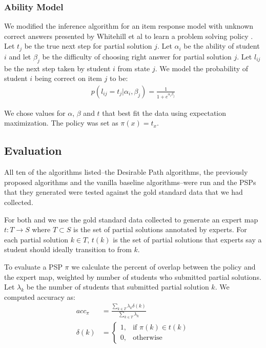 \subsubsection{Ability Model}

We modified the inference algorithm for an item response model with unknown correct answers presented by Whitehill et al to learn a problem solving policy \cite{whitehill2009whose}. Let $t_j$ be the true next step for partial solution $j$. Let $\alpha_i$ be the ability of student $i$ and let $\beta_j$ be the difficulty of choosing right answer for partial solution $j$. Let $l_{ij}$ be the next step taken by student $i$ from state $j$. We model the probability of student $i$ being correct on item $j$ to be:
\begin{align*}
p(l_{ij} = t_j | \alpha_i, \beta_j) = \frac{1}{1 + e^{\alpha_i \beta_j}}
\end{align*}

We chose values for $\alpha$, $\beta$ and $t$ that best fit the data using expectation maximization. The policy was set as $\pi(x) = t_x$.





\subsection{Evaluation}
All ten of the algorithms listed--the Desirable Path algorithms, the previously proposed algorithms and the vanilla baseline algorithms--were run and the PSPs that they generated were tested against the gold standard data that we had collected.

For both \Pa and \Pb we use the gold standard data collected to generate an expert map $t : T \rightarrow S$ where $T \subset S$ is the set of partial solutions annotated by experts. For each partial solution $k \in T$, $t(k)$ is the set of partial solutions that experts say a student should ideally transition to from $k$.

To evaluate a PSP $\pi$ we calculate the percent of overlap between the policy and the expert map, weighted by number of students who submitted partial solutions. Let $\lambda_k$ be the number of students that submitted partial solution $k$. We computed accuracy as:
\begin{align*}
acc_\pi &= \frac{\sum_{k \in T}{\lambda_k \delta(k)}}{\sum_{k \in T}{\lambda_k}}\\
\delta(k) &= 
\begin{cases}
    1,  & \text{if } \pi(k) \in t(k)\\
    0,  & \text{otherwise}
\end{cases}
\end{align*}



